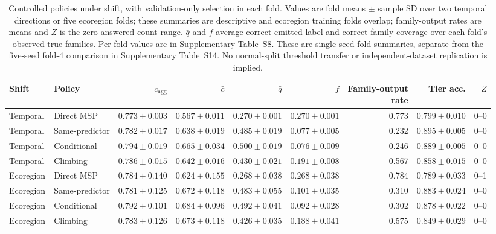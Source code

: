 \begin{table}[pos=htbp]
\centering\scriptsize
\setlength{\tabcolsep}{2.2pt}
\caption{Controlled policies under shift, with validation-only selection in each fold. Values are fold means $\pm$ sample SD over two temporal directions or five ecoregion folds; these summaries are descriptive and ecoregion training folds overlap; family-output rates are means and $Z$ is the zero-answered count range. $\bar q$ and $\bar f$ average correct emitted-label and correct family coverage over each fold's observed true families. Per-fold values are in Supplementary Table~S8. These are single-seed fold summaries, separate from the five-seed fold-4 comparison in Supplementary Table~S14. No normal-split threshold transfer or independent-dataset replication is implied.}
\label{tab:controlled_shift}
\begin{tabular}{llrrrrrrr}
\toprule
Shift & Policy & $c_{\mathrm{agg}}$ & $\bar c$ & $\bar q$ & $\bar f$ & \shortstack{Family-output\\rate} & Tier acc. & $Z$ \\
\midrule
Temporal & Direct MSP & $0.773\pm0.003$ & $0.567\pm0.011$ & $0.270\pm0.001$ & $0.270\pm0.001$ & 0.773 & $0.799\pm0.010$ & 0--0 \\
Temporal & Same-predictor & $0.782\pm0.017$ & $0.638\pm0.019$ & $0.485\pm0.019$ & $0.077\pm0.005$ & 0.232 & $0.895\pm0.005$ & 0--0 \\
Temporal & Conditional & $0.794\pm0.019$ & $0.665\pm0.034$ & $0.500\pm0.019$ & $0.076\pm0.009$ & 0.246 & $0.889\pm0.005$ & 0--0 \\
Temporal & Climbing & $0.786\pm0.015$ & $0.642\pm0.016$ & $0.430\pm0.021$ & $0.191\pm0.008$ & 0.567 & $0.858\pm0.015$ & 0--0 \\
Ecoregion & Direct MSP & $0.784\pm0.140$ & $0.624\pm0.155$ & $0.268\pm0.038$ & $0.268\pm0.038$ & 0.784 & $0.789\pm0.033$ & 0--1 \\
Ecoregion & Same-predictor & $0.781\pm0.125$ & $0.672\pm0.118$ & $0.483\pm0.055$ & $0.101\pm0.035$ & 0.310 & $0.883\pm0.024$ & 0--0 \\
Ecoregion & Conditional & $0.792\pm0.101$ & $0.684\pm0.096$ & $0.492\pm0.041$ & $0.092\pm0.028$ & 0.302 & $0.878\pm0.022$ & 0--0 \\
Ecoregion & Climbing & $0.783\pm0.126$ & $0.673\pm0.118$ & $0.426\pm0.035$ & $0.188\pm0.041$ & 0.575 & $0.849\pm0.029$ & 0--0 \\
\bottomrule
\end{tabular}
\end{table}
